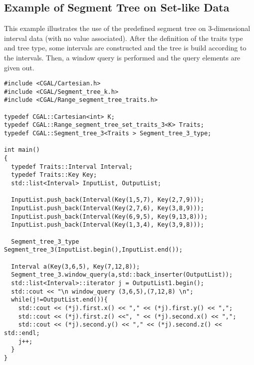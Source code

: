 \subsection{Example of Segment Tree on Set-like Data}

This example illustrates the use of the predefined segment tree
on 3-dimensional interval data (with no value associated). After
the definition of the traits type and tree type, some intervals
are constructed and the tree is build according to the
intervals. Then, a window query is performed and the query
elements are given out.

\begin{verbatim}
#include <CGAL/Cartesian.h>
#include <CGAL/Segment_tree_k.h>
#include <CGAL/Range_segment_tree_traits.h>

typedef CGAL::Cartesian<int> K;
typedef CGAL::Range_segment_tree_set_traits_3<K> Traits;
typedef CGAL::Segment_tree_3<Traits > Segment_tree_3_type;

int main()
{
  typedef Traits::Interval Interval;
  typedef Traits::Key Key;
  std::list<Interval> InputList, OutputList;

  InputList.push_back(Interval(Key(1,5,7), Key(2,7,9)));
  InputList.push_back(Interval(Key(2,7,6), Key(3,8,9)));
  InputList.push_back(Interval(Key(6,9,5), Key(9,13,8)));
  InputList.push_back(Interval(Key(1,3,4), Key(3,9,8)));
 
  Segment_tree_3_type Segment_tree_3(InputList.begin(),InputList.end());

  Interval a(Key(3,6,5), Key(7,12,8));
  Segment_tree_3.window_query(a,std::back_inserter(OutputList));
  std::list<Interval>::iterator j = OutputList1.begin();
  std::cout << "\n window_query (3,6,5),(7,12,8) \n";
  while(j!=OutputList.end()){
    std::cout << (*j).first.x() << "," << (*j).first.y() << ",";
    std::cout << (*j).first.z() <<", " << (*j).second.x() << ",";
    std::cout << (*j).second.y() << "," << (*j).second.z() << std::endl; 
    j++;
  }
}
\end{verbatim}

